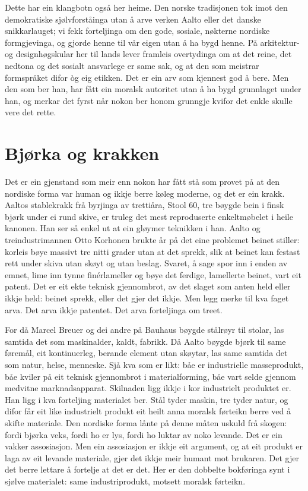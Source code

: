 Dette har ein klangbotn også her heime. Den norske tradisjonen tok imot den demokratiske sjølvforståinga utan å arve verken Aalto eller det danske snikkarlauget; vi fekk forteljinga om den gode, sosiale, nøkterne nordiske formgjevinga, og gjorde henne til vår eigen utan å ha bygd henne. På arkitektur- og designhøgskular her til lands lever framleis overtydinga om at det reine, det nedtona og det sosialt ansvarlege er same sak, og at den som meistrar formspråket difor òg eig etikken. Det er ein arv som kjennest god å bere. Men den som ber han, har fått ein moralsk autoritet utan å ha bygd grunnlaget under han, og merkar det fyrst når nokon ber honom grunngje kvifor det enkle skulle vere det rette.

\section{Bjørka og krakken}

Det er ein gjenstand som meir enn nokon har fått stå som provet på at den nordiske forma var human og ikkje berre køleg moderne, og det er ein krakk. Aaltos stablekrakk frå byrjinga av trettiåra, Stool 60, tre bøygde bein i finsk bjørk under ei rund skive, er truleg det mest reproduserte enkeltmøbelet i heile kanonen. Han ser så enkel ut at ein gløymer teknikken i han. Aalto og treindustrimannen Otto Korhonen brukte år på det eine problemet beinet stiller: korleis bøye massivt tre nitti grader utan at det sprekk, slik at beinet kan festast rett under skiva utan skøyt og utan beslag. Svaret, å sage spor inn i enden av emnet, lime inn tynne finérlameller og bøye det ferdige, lamellerte beinet, vart eit patent. Det er eit ekte teknisk gjennombrot, av det slaget som anten held eller ikkje held: beinet sprekk, eller det gjer det ikkje. Men legg merke til kva faget arva. Det arva ikkje patentet. Det arva forteljinga om treet.

For då Marcel Breuer og dei andre på Bauhaus bøygde stålrøyr til stolar, las samtida det som maskinalder, kaldt, fabrikk. Då Aalto bøygde bjørk til same føremål, eit kontinuerleg, berande element utan skøytar, las same samtida det som natur, helse, menneske. Sjå kva som er likt: båe er industrielle masseprodukt, båe kviler på eit teknisk gjennombrot i materialforming, båe vart selde gjennom medvitne marknadsapparat. Skilnaden ligg ikkje i kor industrielt produktet er. Han ligg i kva forteljing materialet ber. Stål tyder maskin, tre tyder natur, og difor får eit like industrielt produkt eit heilt anna moralsk førteikn berre ved å skifte materiale. Den nordiske forma lånte på denne måten uskuld frå skogen: fordi bjørka veks, fordi ho er lys, fordi ho luktar av noko levande. Det er ein vakker assosiasjon. Men ein assosiasjon er ikkje eit argument, og at eit produkt er laga av eit levande materiale, gjer det ikkje meir humant mot brukaren. Det gjer det berre lettare å fortelje at det er det. Her er den dobbelte bokføringa synt i sjølve materialet: same industriprodukt, motsett moralsk førteikn.

